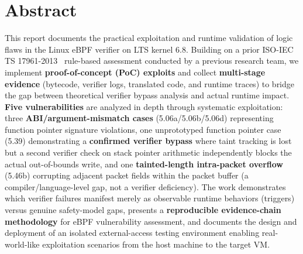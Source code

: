 \chapter*{Abstract}
This report documents the practical exploitation and runtime validation of logic flaws in the Linux eBPF verifier on LTS kernel 6.8. Building on a prior ISO-IEC TS 17961-2013~\cite{ISO17961} rule-based assessment conducted by a previous research team, we implement \textbf{proof-of-concept (PoC) exploits} and collect \textbf{multi-stage evidence} (bytecode, verifier logs, translated code, and runtime traces) to bridge the gap between theoretical verifier bypass analysis and actual runtime impact. \textbf{Five vulnerabilities} are analyzed in depth through systematic exploitation: three \textbf{ABI/argument-mismatch cases} (5.06a/5.06b/5.06d) representing function pointer signature violations, one unprototyped function pointer case (5.39) demonstrating a \textbf{confirmed verifier bypass} where taint tracking is lost but a second verifier check on stack pointer arithmetic independently blocks the actual out-of-bounds write, and one \textbf{tainted-length intra-packet overflow} (5.46b) corrupting adjacent packet fields within the packet buffer (a compiler/language-level gap, not a verifier deficiency). The work demonstrates which verifier failures manifest merely as observable runtime behaviors (triggers) versus genuine safety-model gaps, presents a \textbf{reproducible evidence-chain methodology} for eBPF vulnerability assessment, and documents the design and deployment of an isolated external-access testing environment enabling real-world-like exploitation scenarios from the host machine to the target VM.
\clearpage

